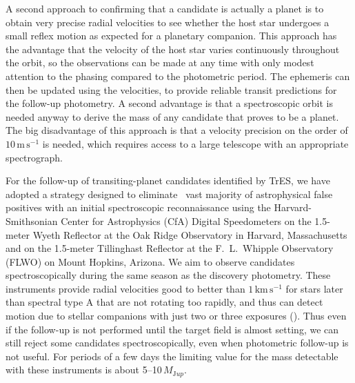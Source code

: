 A second approach to confirming that a candidate is actually a planet is to obtain very precise radial velocities to see whether the host star undergoes a small reflex motion as expected for a planetary companion. This approach has the advantage that the velocity of the host star varies continuously throughout the orbit, so the observations can be made at any time with only modest attention to the phasing compared to the photometric period.  The ephemeris can then be updated using the velocities, to provide reliable transit predictions for the follow-up photometry. A second advantage is that a spectroscopic orbit is needed anyway to derive the mass of any candidate that proves to be a planet.  The big disadvantage of this approach is that a velocity precision on the order of $10\,\mathrm{m\,s^{-1}}$ is needed, which requires access to a large telescope with an appropriate spectrograph.

For the follow-up of transiting-planet candidates identified by TrES, we have adopted a strategy designed to eliminate
\the\ vast majority of astrophysical false positives with an initial spectroscopic reconnaissance using the
Harvard-Smithsonian Center for Astrophysics (CfA) Digital Speedometers \citep{Latham:ASP:1992a} on the 1.5-meter Wyeth
Reflector at the Oak Ridge Observatory in Harvard, Massachusetts and on the 1.5-meter Tillinghast Reflector at the
F.~L.~Whipple Observatory (FLWO) on Mount Hopkins, Arizona. We aim to observe candidates spectroscopically during the
same season as the discovery photometry. These instruments provide radial velocities good to better than
$1\,\mathrm{km\,s^{-1}}$ for stars later than spectral type A that are not rotating too rapidly, and thus can detect
motion due to stellar companions with just two or three exposures
(\citealp[see, e.g.,][]{Latham:ASP:2003a, Charbonneau_Brown_Dunham:AIP:2004a}).%
Thus even if the follow-up is not performed until the target field is almost setting, we can still reject some
candidates spectroscopically, even when photometric follow-up is not useful. For periods of a few days the limiting
value for the mass detectable with these instruments is about 5--10\,$M_{\mathrm Jup}$.

